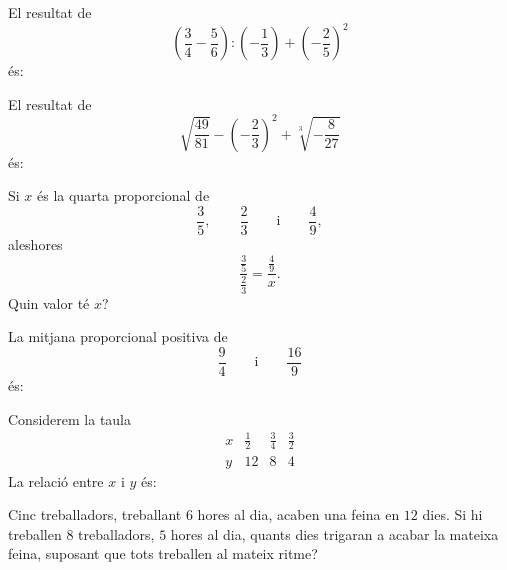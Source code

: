 \begin{enumerate}
\pregunta El resultat de
\[
	\left(\frac{3}{4}-\frac{5}{6}\right):\left(-\frac{1}{3}\right)
	+
	\left(-\frac{2}{5}\right)^2
\]
és:
\begin{enumerate}
\end{enumerate}
\feedback

\pregunta El resultat de
\[
	\sqrt{\frac{49}{81}}
	-
	\left(-\frac{2}{3}\right)^2
	+
	\sqrt[3]{-\frac{8}{27}}
\]
és:
\begin{enumerate}
\end{enumerate}
\feedback

\pregunta Si \(x\) és la quarta proporcional de
\[
	\frac{3}{5},
	\qquad
	\frac{2}{3}
	\qquad\text{i}\qquad
	\frac{4}{9},
\]
aleshores
\[
	\frac{\frac{3}{5}}{\frac{2}{3}}
	=
	\frac{\frac{4}{9}}{x}.
\]
Quin valor té \(x\)?
\begin{enumerate}
\end{enumerate}
\feedback

\pregunta La mitjana proporcional positiva de
\[
	\frac{9}{4}
	\qquad\text{i}\qquad
	\frac{16}{9}
\]
és:
\begin{enumerate}
\end{enumerate}
\feedback

\pregunta Considerem la taula
\[
\begin{array}{c|ccc}
x & \frac{1}{2} & \frac{3}{4} & \frac{3}{2} \\
\hline
y & 12 & 8 & 4
\end{array}
\]
La relació entre \(x\) i \(y\) és:
\begin{enumerate}
\end{enumerate}
\feedback

\pregunta Cinc treballadors, treballant \(6\) hores al dia, acaben una feina en \(12\) dies. Si hi treballen \(8\) treballadors, \(5\) hores al dia, quants dies trigaran a acabar la mateixa feina, suposant que tots treballen al mateix ritme?
\begin{enumerate}
\end{enumerate}
\feedback


\end{enumerate}
